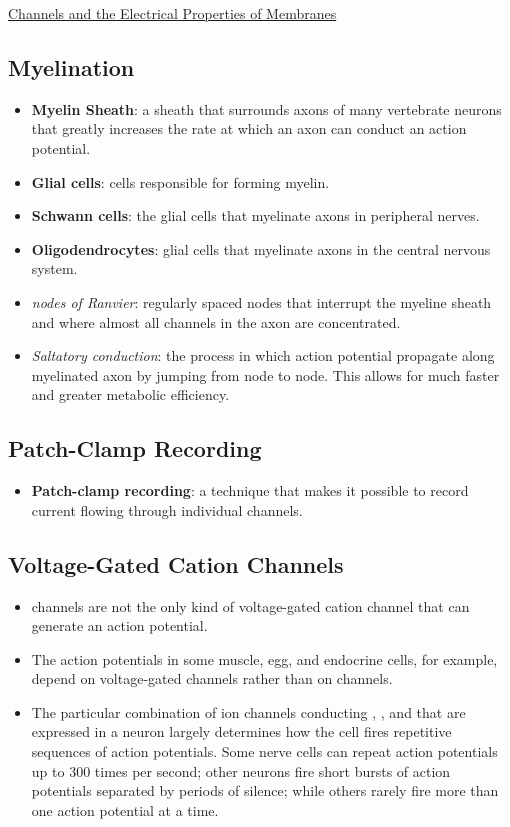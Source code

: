\documentclass[12pt,letterpaper]{article}
\begin{document}
\begin{secbox}{\hyperlink{11}{Channels and the Electrical Properties of Membranes}}
{    \hypertarget{11.3.9}{\subsection*{Myelination}}
    \begin{itemize}
        \item \textbf{Myelin Sheath}: a sheath that surrounds axons of many vertebrate neurons that greatly increases the rate at which an axon can conduct an action potential.
        \item \textbf{Glial cells}: cells responsible for forming myelin. 
        \item \textbf{Schwann cells}: the glial cells that myelinate axons in peripheral nerves.
        \item \textbf{Oligodendrocytes}: glial cells that myelinate axons in the central nervous system.
        \item \textit{nodes of Ranvier}: regularly spaced nodes that interrupt the myeline sheath and where almost all  channels in the axon are concentrated.
        \item \textit{Saltatory conduction}: the process in which action potential propagate along myelinated axon by jumping from node to node. This allows for much faster and greater metabolic efficiency.
    \end{itemize}
    
    \hypertarget{11.3.10}{\subsection*{Patch-Clamp Recording}}
    \begin{itemize}
        \item \textbf{Patch-clamp recording}: a technique that makes it possible to record current flowing through individual channels.
    \end{itemize}

    \hypertarget{11.3.11}{\subsection*{Voltage-Gated Cation Channels}}
    \begin{itemize}
        \item {} channels are not the only kind of voltage-gated cation channel that can generate an action potential.
        \item The action potentials in some muscle, egg, and endocrine cells, for example, depend on voltage-gated  channels rather than on  channels. 
        \item The particular combination of ion channels conducting , , and  that are expressed in a neuron largely determines how the cell fires repetitive sequences of action potentials. Some nerve cells can repeat action potentials up to 300 times per second; other neurons fire short bursts of action potentials separated by periods of silence; while others rarely fire more than one action potential at a time.
    \end{itemize}
    
}
\end{secbox}
\end{document}
